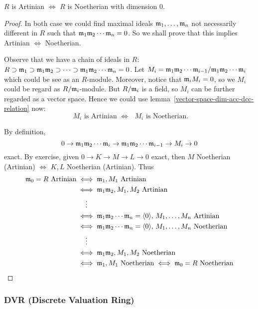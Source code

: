 \begin{theorem}
  $R$ is Artinian $\iff$ $R$ is Noetherian with dimension $0$.


\begin{proof}
  In both case we could find maximal ideals $\mathfrak{m}_1, \dots, \mathfrak{m}_n$
  not necessarily different in $R$ such that $\mathfrak{m}_1\mathfrak{m}_2 \dotsm \mathfrak{m}_n = 0$.
  So we shall prove that this implies Artinian $\iff$ Noetherian.

  Observe that we have a chain of ideals in $R$:
  $R \supset \mathfrak{m}_1 \supset \mathfrak{m}_1\mathfrak{m}_2 \supset \dots \supset
  \mathfrak{m}_1\mathfrak{m}_2\dotsm\mathfrak{m}_n = 0$.
  Let $M_i = {\mathfrak{m}_1\mathfrak{m}_2\dotsm\mathfrak{m}_{i-1}}/{\mathfrak{m}_1\mathfrak{m}_2\dotsm\mathfrak{m}_i}$
  which could be see as an $R$-module.
  Moreover, notice that $\mathfrak{m}_i M_i = 0$, so we $M_i$
  could be regard as ${R}/{\mathfrak{m}_i}$-module.
  But ${R}/{\mathfrak{m}_i}$ is a field, so $M_i$ can be further regarded as a vector
  space. Hence we could use lemma~\ref{vector-space-dim-acc-dcc-relation} now:
  \[
  \text{ $M_i$ is Artinian $\iff$ $M_i$ is Noetherian. }
  \]

  By definition,
  \[
    0 \to \mathfrak{m}_1\mathfrak{m}_2\dotsm\mathfrak{m}_i \to \mathfrak{m}_1\mathfrak{m}_2\dotsm\mathfrak{m}_{i-1}
    \to M_i \to 0
  \] exact.
  By exercise, given $0 \to K \to M \to L \to 0$ exact, then $M$ Noetherian (Artinian)
  $\iff$ $K, L$ Noetherian (Artinian). Thus
  \[
    \begin{aligned}
      \mathfrak{m}_0 = R \text{ Artinian} & \iff \mathfrak{m}_1 , M_1 \text{ Artinian} \\
      & \iff \mathfrak{m}_1 \mathfrak{m}_2 , M_1, M_2 \text{ Artinian} \\
      & \hspace{13pt} \vdots \\
      & \iff \mathfrak{m}_1 \mathfrak{m}_2 \cdots \mathfrak{m}_n = \langle0\rangle,\, M_1, 
      \dots, M_n \text{ Artinian} \\
      & \iff \mathfrak{m}_1 \mathfrak{m}_2 \cdots \mathfrak{m}_n = \langle0\rangle,\, M_1, 
      \dots, M_n \text{ Noetherian} \\
      & \hspace{13pt} \vdots \\
      & \iff \mathfrak{m}_1 \mathfrak{m}_2 , M_1, M_2 \text{ Noetherian} \\
      & \iff \mathfrak{m}_1 , M_1 \text{ Noetherian} \iff \mathfrak{m}_0 = R \text{ Noetherian}
    \end{aligned}
  \]
\end{proof}
\end{theorem}


\subsubsection{DVR (Discrete Valuation Ring)}

